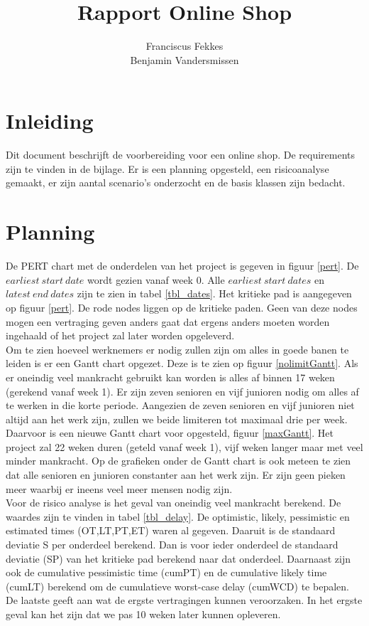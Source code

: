 \documentclass[•]{article}
\title{Rapport Online Shop}
\author{Franciscus Fekkes \\ Benjamin Vandersmissen}
\begin{document}
\maketitle
\section{Inleiding}
Dit document beschrijft de voorbereiding voor een online shop. De requirements zijn te vinden in de bijlage. Er is een planning opgesteld, een risicoanalyse gemaakt, er zijn aantal scenario's onderzocht en de basis klassen zijn bedacht.\\

\section{Planning}
De PERT chart met de onderdelen van het project is gegeven in figuur \ref{pert}. De $earliest\ start\ date$ wordt gezien vanaf week $0$. Alle $earliest\ start\ dates$ en $latest\ end\ dates$ zijn te zien in tabel \ref{tbl_dates}. Het kritieke pad is aangegeven op figuur \ref{pert}. De rode nodes liggen op de kritieke paden. Geen van deze nodes mogen een vertraging geven anders gaat dat ergens anders moeten worden ingehaald of het project zal later worden opgeleverd.\\
Om te zien hoeveel werknemers er nodig zullen zijn om alles in goede banen te leiden is er een Gantt chart opgezet. Deze is te zien op figuur \ref{nolimitGantt}. Als er oneindig veel mankracht gebruikt kan worden is alles af binnen 17 weken (gerekend vanaf week 1). Er zijn zeven senioren en vijf junioren nodig om alles af te werken in die korte periode. Aangezien de zeven senioren en vijf junioren niet altijd aan het werk zijn, zullen we beide limiteren tot maximaal drie per week. Daarvoor is een nieuwe Gantt chart voor opgesteld, figuur \ref{maxGantt}. Het project zal 22 weken duren (geteld vanaf week 1), vijf weken langer maar met veel minder mankracht. Op de grafieken onder de Gantt chart is ook meteen te zien dat alle senioren en junioren constanter aan het werk zijn. Er zijn geen pieken meer waarbij er ineens veel meer mensen nodig zijn.\\
Voor de risico analyse is het geval van oneindig veel mankracht berekend. De waardes zijn te vinden in tabel \ref{tbl_delay}. De optimistic, likely, pessimistic en estimated times (OT,LT,PT,ET) waren al gegeven. Daaruit is de standaard deviatie S per onderdeel berekend. Dan is voor ieder onderdeel de standaard deviatie (SP) van het kritieke pad berekend naar dat onderdeel. Daarnaast zijn ook de cumulative pessimistic time (cumPT) en de cumulative likely time (cumLT) berekend om de cumulatieve worst-case delay (cumWCD) te bepalen. De laatste geeft aan wat de ergste vertragingen kunnen veroorzaken. In het ergste geval kan het zijn dat we pas 10 weken later kunnen opleveren.
\end{document}
